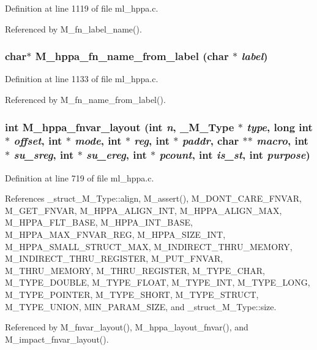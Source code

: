 Definition at line 1119 of file ml\_\-hppa.c.

Referenced by M\_\-fn\_\-label\_\-name().
\subsubsection{\setlength{\rightskip}{0pt plus 5cm}char$\ast$ M\_\-hppa\_\-fn\_\-name\_\-from\_\-label (char $\ast$ {\em label})}\label{m__hppa_8h_f2960456940ae7a768be5669e2770171}




Definition at line 1133 of file ml\_\-hppa.c.

Referenced by M\_\-fn\_\-name\_\-from\_\-label().
\subsubsection{\setlength{\rightskip}{0pt plus 5cm}int M\_\-hppa\_\-fnvar\_\-layout (int {\em n}, \bf{\_\-M\_\-Type} $\ast$ {\em type}, long int $\ast$ {\em offset}, int $\ast$ {\em mode}, int $\ast$ {\em reg}, int $\ast$ {\em paddr}, char $\ast$$\ast$ {\em macro}, int $\ast$ {\em su\_\-sreg}, int $\ast$ {\em su\_\-ereg}, int $\ast$ {\em pcount}, int {\em is\_\-st}, int {\em purpose})}\label{m__hppa_8h_c4a83ef7b3974b1cbe2e33c5d38b8b4e}




Definition at line 719 of file ml\_\-hppa.c.

References \_\-struct\_\-M\_\-Type::align, M\_\-assert(), M\_\-DONT\_\-CARE\_\-FNVAR, M\_\-GET\_\-FNVAR, M\_\-HPPA\_\-ALIGN\_\-INT, M\_\-HPPA\_\-ALIGN\_\-MAX, M\_\-HPPA\_\-FLT\_\-BASE, M\_\-HPPA\_\-INT\_\-BASE, M\_\-HPPA\_\-MAX\_\-FNVAR\_\-REG, M\_\-HPPA\_\-SIZE\_\-INT, M\_\-HPPA\_\-SMALL\_\-STRUCT\_\-MAX, M\_\-INDIRECT\_\-THRU\_\-MEMORY, M\_\-INDIRECT\_\-THRU\_\-REGISTER, M\_\-PUT\_\-FNVAR, M\_\-THRU\_\-MEMORY, M\_\-THRU\_\-REGISTER, M\_\-TYPE\_\-CHAR, M\_\-TYPE\_\-DOUBLE, M\_\-TYPE\_\-FLOAT, M\_\-TYPE\_\-INT, M\_\-TYPE\_\-LONG, M\_\-TYPE\_\-POINTER, M\_\-TYPE\_\-SHORT, M\_\-TYPE\_\-STRUCT, M\_\-TYPE\_\-UNION, MIN\_\-PARAM\_\-SIZE, and \_\-struct\_\-M\_\-Type::size.

Referenced by M\_\-fnvar\_\-layout(), M\_\-hppa\_\-layout\_\-fnvar(), and M\_\-impact\_\-fnvar\_\-layout().
